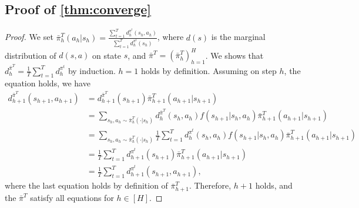 \subsection{Proof of \cref{thm:converge}}
\label{proof:converge}
\begin{proof}
We set $\bar{\pi}^T_h(a_h|s_h) = \frac{\sum^T_{t=1} d^{\pi^t}_h(s_h,a_h)}{\sum^T_{t=1} d^{\pi^t}_h(s_h)}$, where $d(s)$ is the marginal distribution of $d(s,a)$ on state $s$, and $\bar{\pi}^T = (\bar{\pi}^T_h)_{h=1}^H$. We shows that $d^{\bar{\pi}^T}_h = \frac{1}{T}\sum^T_{t=1} d^{\pi^t}_h$ by induction. $h=1$ holds by definition. Assuming on step $h$, the equation holds, we have
\begin{align*}
    d^{\bar{\pi}^T}_{h+1}(s_{h+1},a_{h+1}) &= d^{\bar{\pi}^T}_{h+1}(s_{h+1}) \bar{\pi}^T_{h+1}(a_{h+1}|s_{h+1})\\
     &= \sum_{s_h, a_h\sim \bar{\pi}^T_h(\cdot|s_h)} d^{\bar{\pi}^T}_h(s_h,a_h) f(s_{h+1}|s_h,a_h) \bar{\pi}^T_{h+1}(a_{h+1}|s_{h+1})\\
     &=\sum_{s_h, a_h\sim \bar{\pi}^T_h(\cdot|s_h)}  \frac{1}{T}\sum^T_{t=1} d^{\pi^t}_h(s_h,a_h) f(s_{h+1}|s_h,a_h) \bar{\pi}^T_{h+1}(a_{h+1}|s_{h+1})\\
     &=\frac{1}{T}\sum_{t=1}^T  d_{h+1}^{\pi^t}(s_{h+1})\bar{\pi}^T_{h+1}(a_{h+1}|s_{h+1}) \\
     &=\frac{1}{T} \sum^T_{t=1} d^{\pi^t}_{h+1}(s_{h+1},a_{h+1}),
\end{align*}
where the last equation holds by definition of $\bar{\pi}^T_{h+1}$. 
Therefore, $h+1$ holds, and the $\bar{\pi}^T$ satisfy all equations for $h\in [H]$.


\end{proof}
